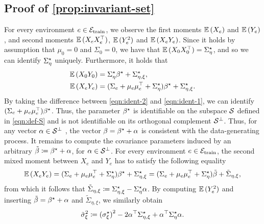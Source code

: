 \subsection{Proof of \cref{prop:invariant-set}}\label{sec:apx-proof-invariant-set}
For every environment $e \in \mathcal{E}_{\mathrm{train}}$, we observe the first moments $\mathbb{E}\,(X_e)$ and $\mathbb{E}\,(Y_e)$,
and second moments $\mathbb{E}\,(X_eX_e^\top)$, $\mathbb{E}\,(Y_e^2)$ and $\mathbb{E}\,(X_eY_e)$.
Since it holds by assumption that $\mu_0 = 0$ and $\Sigma_0 = 0$, we have that  $\mathbb{E}\,(X_0X_0^\top) = \Sigma^\star_{\eta}$, and so we can identify $\Sigma^\star_{\eta}$ uniquely. Furthermore, it holds that
\begin{align}
    \mathbb{E}\,(X_0Y_0) &= \Sigma^\star_{\eta} \beta^{\star} + \Sigma^\star_{\eta,\xi}, \label{eqn:ident-1}\\
    \mathbb{E}\,(X_eY_e) &= ( \Sigma_e + \mu_e \mu_e^\top + \Sigma^\star_{\eta}) \beta^{\star} + \Sigma^\star_{\eta,\xi}.
    \label{eqn:ident-2}
\end{align}
By taking the difference between \cref{eqn:ident-2} and \cref{eqn:ident-1},
we can identify $(\Sigma_e + \mu_e \mu_e^\top) \beta^{\star}$.
Thus, 
the parameter $\beta^{\star}$ is identifiable on the subspace $\mathcal{S}$ defined in \cref{eqn:def-S} and is not identifiable on its orthogonal complement $\mathcal{S}^\perp$.
Thus, for any vector $\alpha \in \mathcal{S}^\perp$ , the vector $\beta = \beta^{\star} + \alpha$ is consistent with the data-generating process. It remains to compute the covariance parameters induced by an arbitrary $\tilde\beta \coloneqq \beta^{\star} + \alpha$, for $\alpha \in \mathcal{S}^\perp$. For every environment $e \in \mathcal{E}_{\mathrm{train}}$,  the second mixed moment between $X_e$ and $Y_e$ has to satisfy the following equality
\begin{align*}
    \mathbb{E}\,(X_eY_e) = (\Sigma_e + \mu_e\mu_e^\top + \Sigma^\star_{\eta})\beta^{\star} + \Sigma^\star_{\eta,\xi} = (\Sigma_e + \mu_e\mu_e^\top + \Sigma^\star_{\eta}) \tilde{\beta}+ \tilde{\Sigma}_{\eta, \xi},
\end{align*}
from which it follows that $\tilde{\Sigma}_{\eta, \xi}
 \coloneqq \Sigma^\star_{\eta,\xi} - \Sigma^\star_{\eta} \alpha$. By computing $\mathbb{E}\,(Y_e^2)$ and inserting $\tilde{\beta} = \beta^{\star} + \alpha$ and $\tilde{\Sigma}_{\eta, \xi}$, we similarly obtain 
\begin{align*}
    \tilde{\sigma}_{\xi}^{2} \coloneqq {(\sigma_\xi^\star)}^2 - 2 \alpha^\top \Sigma^\star_{\eta,\xi} + \alpha^\top \Sigma^\star_{\eta} \alpha. 
\end{align*}
